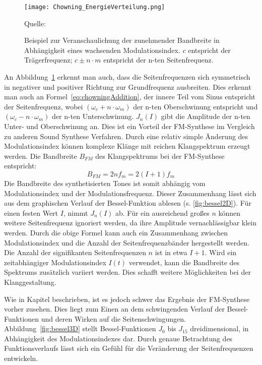 \begin{figure} [ht]
\centering
  \texttt{[image: Chowning\_EnergieVerteilung.png]}
\caption{Beispiel zur Veranschaulichung der zunehmender Bandbreite in Abhängigkeit eines wachsenden Modulationsindex. $c$ entspricht der Trägerfrequenz; $c\pm n\cdot m$ entspricht der n-ten Seitenfrequenz.}
\label{fig:chowningEnergieVerteilung}
Quelle: \cite{chowningPaper}
\end{figure}
\FloatBarrier

An Abbildung~\ref{fig:chowningEnergieVerteilung} erkennt man auch, dass die Seitenfrequenzen sich symmetrisch in negativer und positiver Richtung zur Grundfrequenz ausbreiten. Dies erkennt man auch an Formel~\ref{eq:chowningAddition}, der innere Teil vom Sinus entspricht der Seitenfrequenz, wobei $(\omega_c+n\cdot \omega_m)$ der n-ten Oberschwinung entspricht und $(\omega_c-n\cdot \omega_m)$ der n-ten Unterschwinung. $J_n(I)$ gibt die Amplitude der n-ten Unter- und Oberschwinung an. 
Dies ist ein Vorteil der FM-Synthese im Vergleich zu anderen Sound Synthese Verfahren. Durch eine relativ simple Änderung des Modulationsindex können komplexe Klänge mit reichen Klangspektrum erzeugt werden. Die Bandbreite $B_{FM}$ des Klangspektrums bei der FM-Synthese entspricht:\cite[S. 221]{lathi}
\begin{equation}
B_{FM}=2nf_m=2(I+1)f_m
\label{eq:fmBandwidth}
\end{equation} 
Die Bandbreite des synthetisierten Tones ist somit abhängig vom Modulationsindex und der Modulationsfrequenz. 
Dieser Zusammenhang lässt sich aus dem graphischen Verlauf der Bessel-Funktion ablesen (s. \ref{fig:bessel2D}). Für einen festen Wert $I$, nimmt $J_n(I)$ ab. Für ein ausreichend großes $n$ können weitere Seitenfrequenz ignoriert werden, da ihre Amplitude vernachlässigbar klein werden. 
Durch die obige Formel kann auch ein Zusammenhang zwischen Modulationsindex und die Anzahl der Seitenfrequenzbänder hergestellt werden. Die Anzahl der signifikanten Seitenfrequenzen $n$ ist in etwa $I+1$. Wird ein zeitabhängiger Modulationsindex $I(t)$ verwendet, kann die Bandbreite des Spektrums zusätzlich variiert werden. Dies schafft weitere Möglichkeiten bei der Klanggestaltung. 

Wie in Kapitel  beschrieben, ist es jedoch schwer das Ergebnis der FM-Synthese vorher zusehen. Dies liegt zum Einen an dem schwingenden Verlauf der Bessel-Funktionen und deren Wirken auf die Seitenschwingungen. Abbildung~\ref{fig:bessel3D} stellt Bessel-Funktionen $J_0$ bis $J_{15}$ dreidimensional, in Abhängigkeit des Modulationsindexes dar.
Durch genaue Betrachtung des Funktionsverlaufs lässt sich ein Gefühl für die Veränderung der Seitenfrequenzen entwickeln.

